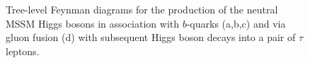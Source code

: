 \begin{figure}[tp]
     \begin{center}
     \hspace{0.2cm}	
     	\hspace{0.2cm}	
     \end{center}
    \caption{Tree-level Feynman diagrams for the production of the neutral MSSM Higgs bosons in association with  $b$-quarks (a,b,c) and via gluon fusion (d) 
	 with subsequent Higgs boson decays into a pair of $\tau$ leptons.}
   \label{fig:prod}
\end{figure}

